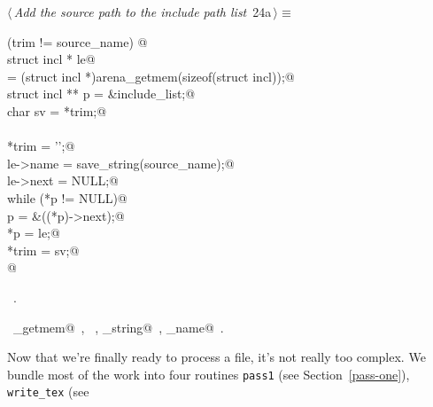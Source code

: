 \documentclass[a4paper]{report}
\begin{document}
\begin{flushleft} \small
\begin{minipage}{\linewidth}\label{scrap34}\raggedright\small
{} $\langle\,${\it Add the source path to the include path list}\nobreak\ {\footnotesize {24a}}$\,\rangle\equiv$
\vspace{-1ex}
\begin{list}{}{} \item
\mbox{}\verb@if (trim != source_name) {@\\
\mbox{}\verb@   struct incl * le@\\
\mbox{}\verb@      = (struct incl *)arena_getmem(sizeof(struct incl));@\\
\mbox{}\verb@   struct incl ** p = &include_list;@\\
\mbox{}\verb@   char sv = *trim;@\\
\mbox{}\verb@@\\
\mbox{}\verb@   *trim = '\0';@\\
\mbox{}\verb@   le->name = save_string(source_name);@\\
\mbox{}\verb@   le->next = NULL;@\\
\mbox{}\verb@   while (*p != NULL)@\\
\mbox{}\verb@      p = &((*p)->next);@\\
\mbox{}\verb@   *p = le;@\\
\mbox{}\verb@   *trim = sv;@\\
\mbox{}\verb@}@\\
\mbox{}\verb@@{\NWsep}
\end{list}
\vspace{-1.5ex}
\footnotesize
\begin{list}{}{\setlength{\itemsep}{-\parsep}\setlength{\itemindent}{-\leftmargin}}
\item \NWtxtMacroRefIn\ .
\item \NWtxtIdentsUsed\nobreak\  \verb@arena_getmem@\nobreak\ , \verb@incl@\nobreak\ , \verb@save_string@\nobreak\ , \verb@source_name@\nobreak\ .
\item{}
\end{list}
\end{minipage}\vspace{4ex}
\end{flushleft}
Now that we're finally ready to process a file, it's not really too
complex.  We bundle most of the work into four routines \verb|pass1|
(see Section~\ref{pass-one}), \verb|write_tex| (see
\end{document}
